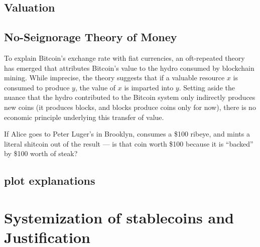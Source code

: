 \subsection{Valuation}





\clearpage
\subsection{No-Seignorage Theory of Money}

To explain Bitcoin's exchange rate with fiat currencies, an oft-repeated theory has emerged that attributes Bitcoin's value to the hydro consumed by blockchain mining. While imprecise, the theory suggests that if a valuable resource $x$ is consumed to produce $y$, the value of $x$ is imparted into $y$. Setting aside the nuance that the hydro contributed to the Bitcoin system only indirectly produces new coins (it produces blocks, and blocks produce coins only for now), there is no economic principle underlying this transfer of value.

If Alice goes to Peter Luger's in Brooklyn, consumes a \$100 ribeye, and mints a literal shitcoin out of the result --- is that coin worth \$100 because it is ``backed'' by \$100 worth of steak?










\subsection{plot explanations}







\section{Systemization of stablecoins and Justification}



